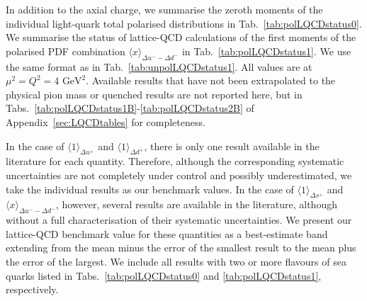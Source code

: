 In addition to the axial charge, we summarise the zeroth moments of the 
individual light-quark total polarised distributions in 
Tab.~\ref{tab:polLQCDstatus0}. 
%
We summarise the status of lattice-QCD calculations of the
first moments of the polarised PDF combination 
$\langle x \rangle_{\Delta u^- - \Delta d^-}$ in Tab.~\ref{tab:polLQCDstatus1}. 
%
We use the same format as in Tab.~\ref{tab:unpolLQCDstatus1}.
%
All values are at $\mu^2=Q^2=4\mbox{ GeV}^2$.
%
Available results that have not been extrapolated to the physical pion mass
or quenched results are not reported here, but in 
Tabs.~\ref{tab:polLQCDstatus1B}-\ref{tab:polLQCDstatus2B} of
Appendix~\ref{sec:LQCDtables} for completeness.

In the case of $\langle 1 \rangle_{\Delta u^+}$ and $\langle 1 \rangle_{\Delta d^+}$,
there is only one result available in the literature for each quantity.
%
Therefore, although the corresponding systematic uncertainties are not 
completely under control and possibly underestimated, we take the individual 
results as our benchmark values.
%
In the case of $\langle 1 \rangle_{\Delta s^+}$ and 
$\langle x \rangle_{\Delta u^- - \Delta d^-}$, however, several results are available
in the literature, although without a full characterisation of
their systematic uncertainties.
%
We present our lattice-QCD benchmark value for these quantities as
a best-estimate band extending from the mean minus the error of the 
smallest result to the mean plus the error of the largest. 
%
We include all results with two or more flavours of sea quarks listed in 
Tabs.~\ref{tab:polLQCDstatus0} and \ref{tab:polLQCDstatus1}, respectively.


